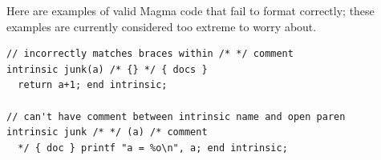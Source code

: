 \documentclass{article}
\begin{document}
Here are examples of valid Magma code that fail to format correctly;
these examples are currently considered too extreme to worry about.

\begin{verbatim}
// incorrectly matches braces within /* */ comment
intrinsic junk(a) /* {} */ { docs }
  return a+1; end intrinsic;

// can't have comment between intrinsic name and open paren
intrinsic junk /* */ (a) /* comment
  */ { doc } printf "a = %o\n", a; end intrinsic;
\end{verbatim}
\end{document}
